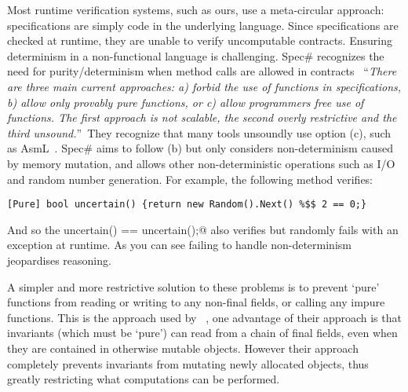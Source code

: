 Most runtime verification systems, such as ours, use a meta-circular approach: specifications are simply code in the underlying language. Since specifications are checked at runtime, they are unable to verify uncomputable contracts.
 Ensuring determinism in a non-functional language is challenging. Spec\# recognizes the need for purity/determinism when method calls are allowed in contracts~\cite{barnett200499} ``\emph{There are three main current approaches: a) forbid the use of functions in specifications, b) allow only provably pure functions, or c) allow programmers free use
	of functions. The first approach is not scalable, the second overly restrictive and
	the third unsound.}''\ 
They recognize that many tools unsoundly use option (c), such as AsmL~\cite{barnett2003runtime}.
Spec\# aims to follow (b) but only considers non-determinism caused by memory mutation, and allows other non-deterministic operations such as I/O and random number generation. For example, the following method verifies:
\begin{lstlisting}
[Pure] bool uncertain() {return new Random().Next() %$$ 2 == 0;}
\end{lstlisting}
And so the \Q@assert uncertain() == uncertain();@ also verifies but randomly fails with an exception at runtime.
As you can see failing to handle non-determinism jeopardises reasoning.

A simpler and more restrictive solution to these problems is to prevent `pure' functions from reading or writing to any non-final fields, or calling any impure functions. This is the approach used by ~\cite{?}, one advantage of their approach is that invariants (which must be `pure') can read from a chain of final fields, even when they are contained in otherwise mutable objects. However their approach completely prevents invariants from mutating newly allocated objects, thus greatly restricting what computations can be performed.







